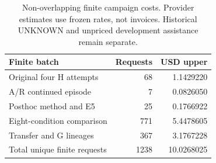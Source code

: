 \begin{table}[htbp]
\centering\small
\begin{tabular}{@{}lrr@{}}
\toprule
Finite batch & Requests & USD upper \\
\midrule
Original four H attempts & 68 & 1.1429220 \\
A/R continued episode & 7 & 0.0826050 \\
Posthoc method and E5 & 25 & 0.1766922 \\
Eight-condition comparison & 771 & 5.4478605 \\
Transfer and G lineages & 367 & 3.1767228 \\
Total unique finite requests & 1238 & 10.0268025 \\
\bottomrule
\end{tabular}
\caption{Non-overlapping finite campaign costs. Provider estimates use frozen rates, not invoices. Historical UNKNOWN and unpriced development assistance remain separate.}\label{tab:costs}
\end{table}
